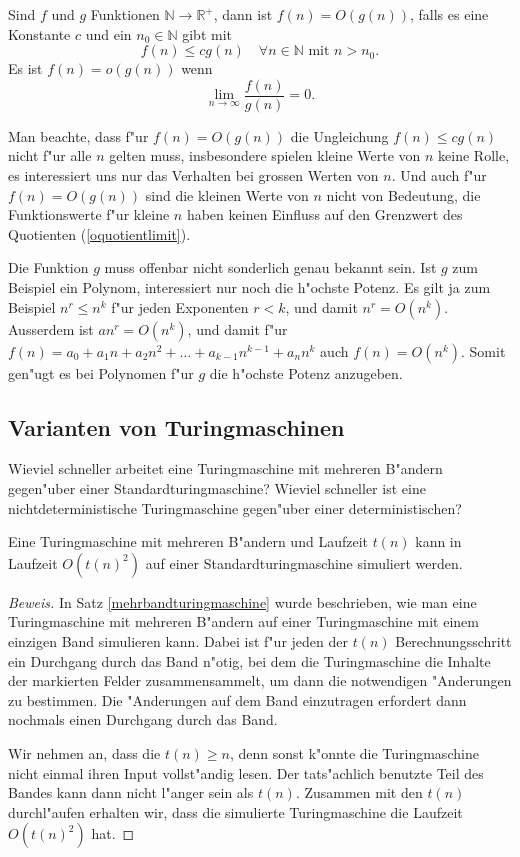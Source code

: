 \begin{definition}
Sind $f$ und $g$ Funktionen $\mathbb N\to\mathbb R^+$, dann ist
$f(n)=O(g(n))$, falls es eine Konstante $c$ und ein $n_0\in\mathbb N$
gibt mit
\[
f(n)\le cg(n)\quad \forall n\in\mathbb N\text{ mit } n > n_0.
\]
Es ist $f(n)=o(g(n))$ wenn 
\begin{equation}
\lim_{n\to\infty}\frac{f(n)}{g(n)}=0.
\label{oquotientlimit}
\end{equation}
\end{definition}
Man beachte, dass f"ur $f(n)=O(g(n))$ die Ungleichung $f(n)\le
cg(n)$ nicht f"ur alle $n$ gelten muss, insbesondere spielen kleine
Werte von $n$ keine Rolle, es interessiert uns nur das Verhalten
bei grossen Werten von $n$.
Und auch f"ur $f(n)=O(g(n))$ sind die kleinen Werte von $n$ nicht
von Bedeutung, die Funktionswerte f"ur kleine $n$ haben keinen
Einfluss auf den Grenzwert des Quotienten (\ref{oquotientlimit}).

Die Funktion $g$ muss offenbar nicht sonderlich genau bekannt
sein. Ist $g$ zum Beispiel ein Polynom, interessiert nur noch
die h"ochste Potenz. Es gilt ja zum Beispiel
$ n^r\le n^k $ f"ur jeden Exponenten $r<k$, und damit
$n^r=O(n^k)$. Ausserdem ist $an^r=O(n^k)$, und damit
f"ur $f(n)=a_0+a_1n+a_2n^2+\dots+a_{k-1}n^{k-1}+a_nn^k$ auch
$ f(n)=O(n^k) $. Somit gen"ugt es bei Polynomen f"ur $g$ die
h"ochste Potenz anzugeben.

\subsection{Varianten von Turingmaschinen}
Wieviel schneller arbeitet eine Turingmaschine mit mehreren B"andern 
gegen"uber einer Standardturingmaschine? Wieviel schneller ist eine
nichtdeterministische Turingmaschine gegen"uber einer deterministischen?

\begin{satz}
Eine Turingmaschine mit mehreren B"andern und Laufzeit $t(n)$ kann
in Laufzeit $O(t(n)^2)$ auf einer Standardturingmaschine
simuliert werden.
\end{satz}

\begin{proof}[Beweis]
In Satz \ref{mehrbandturingmaschine} wurde beschrieben, wie man eine
Turingmaschine mit mehreren B"andern auf einer Turingmaschine mit
einem einzigen Band simulieren kann. Dabei ist f"ur jeden der
$t(n)$ Berechnungsschritt ein Durchgang durch das Band n"otig, bei
dem die Turingmaschine die Inhalte der markierten Felder zusammensammelt,
um dann die notwendigen "Anderungen zu bestimmen. Die "Anderungen
auf dem Band einzutragen erfordert dann nochmals einen Durchgang
durch das Band.

Wir nehmen an, dass die $t(n)\ge n$, denn sonst k"onnte die
Turingmaschine nicht einmal ihren Input vollst"andig lesen.
Der tats"achlich benutzte Teil des Bandes kann dann nicht l"anger sein
als $t(n)$. Zusammen mit den $t(n)$ durchl"aufen erhalten wir,
dass die simulierte Turingmaschine die Laufzeit $O(t(n)^2)$ hat.
\end{proof}

